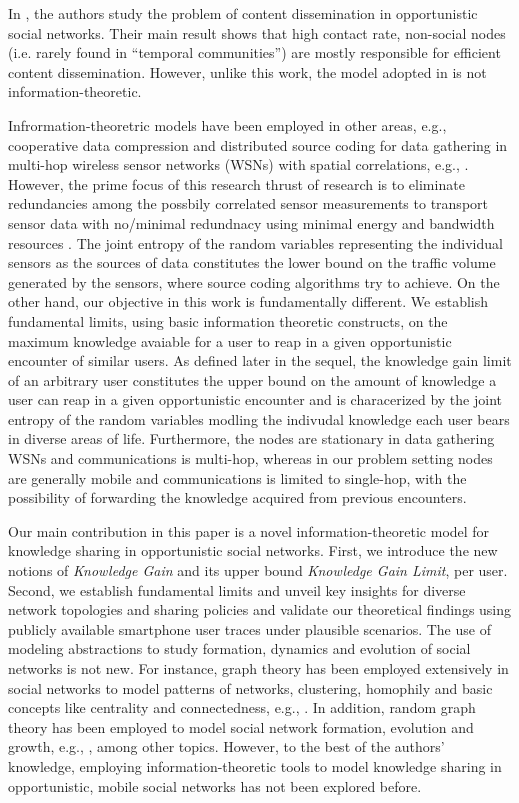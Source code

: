 \documentclass[conference]{IEEEtran}
\theoremstyle{definition}
\begin{document}
In \cite{mobihoc}, the authors study the problem of content dissemination in 
opportunistic social networks. Their main result shows that high contact rate, 
non-social nodes (i.e. rarely found in ``temporal communities'') are mostly 
responsible for efficient content dissemination. However, unlike this work, the 
model adopted in \cite{mobihoc} is not information-theoretic. 

Infrormation-theoretric models have been employed in other areas, e.g., cooperative data compression and distributed source coding for data gathering in multi-hop wireless sensor networks (WSNs) with spatial correlations, e.g., \cite{ramachandran,servetto,marco,govindan,elbatt}. However, the prime focus of this research thrust of research is to eliminate redundancies 
among the possbily correlated sensor measurements to transport sensor data with no/minimal 
redundnacy using minimal energy and bandwidth resources \cite{govindan,servetto}. The joint entropy of the random variables representing the individual sensors as the sources of data constitutes the lower bound on the traffic volume generated by the sensors, where source coding algorithms try to achieve. On the other hand, our objective in this work is fundamentally different. We establish fundamental limits, using basic information theoretic constructs, on the maximum knowledge avaiable for a user to reap in a given opportunistic encounter of similar users. As defined later in the sequel, the knowledge gain limit of an arbitrary user constitutes the upper bound on the amount of knowledge a user can reap in a given opportunistic encounter and is characerized by the joint entropy of the random variables modling the indivudal knowledge each user bears in diverse areas of life. Furthermore, the nodes are stationary in data gathering WSNs and communications is multi-hop, whereas in our problem setting nodes are generally mobile and communications is limited to single-hop, with the possibility of forwarding the knowledge acquired from previous encounters.


Our main contribution in this paper is a novel information-theoretic
model for knowledge sharing in opportunistic social networks. 
First, we introduce the new notions of {\it Knowledge Gain} and 
its upper bound {\it Knowledge Gain Limit}, per user.
Second, we establish fundamental limits and unveil key insights for 
diverse network topologies and sharing policies and validate 
our theoretical findings using publicly available smartphone user traces
under plausible scenarios. The use of modeling abstractions to study formation, 
dynamics and evolution of social networks is not new. For instance, graph theory has been employed extensively 
in social networks to model patterns of networks, clustering, homophily and basic concepts like centrality and connectedness, e.g., \cite{jackson,graph1,graph3}. In addition, random graph theory has been employed to model social network formation, evolution and growth, e.g., \cite{erdos,bollobas,wasserman,graph2}, among other topics. However, to the best of the authors' knowledge, employing information-theoretic tools to model knowledge sharing in opportunistic, mobile social networks has not been explored before.
\end{document}
